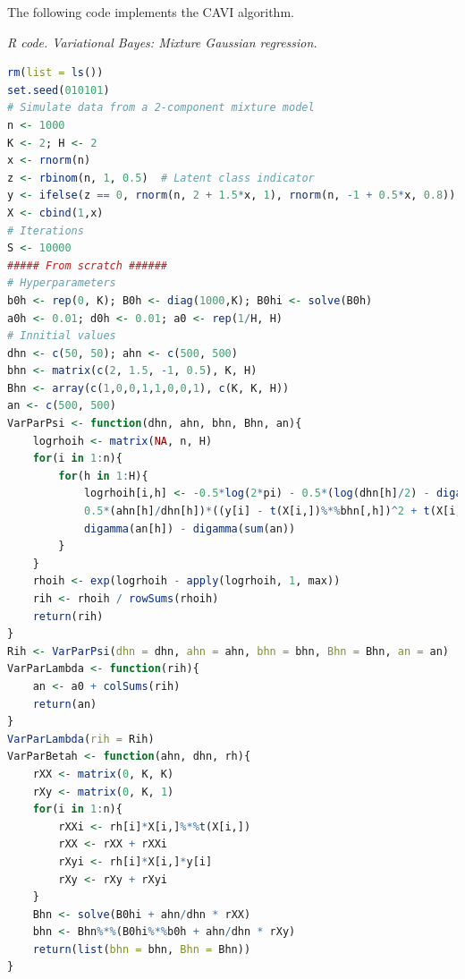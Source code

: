 \begin{enumerate}[leftmargin=*]
The following code implements the CAVI algorithm.
\begin{tcolorbox}[enhanced,width=4.67in,center upper,
	fontupper=\large\bfseries,drop shadow southwest,sharp corners]
	\textit{R code. Variational Bayes: Mixture Gaussian regression.}
	\begin{VF}
		\begin{lstlisting}[language=R]
rm(list = ls())
set.seed(010101)
# Simulate data from a 2-component mixture model
n <- 1000
K <- 2; H <- 2
x <- rnorm(n)
z <- rbinom(n, 1, 0.5)  # Latent class indicator
y <- ifelse(z == 0, rnorm(n, 2 + 1.5*x, 1), rnorm(n, -1 + 0.5*x, 0.8))
X <- cbind(1,x)
# Iterations
S <- 10000
##### From scratch ######
# Hyperparameters
b0h <- rep(0, K); B0h <- diag(1000,K); B0hi <- solve(B0h) 
a0h <- 0.01; d0h <- 0.01; a0 <- rep(1/H, H)
# Innitial values
dhn <- c(50, 50); ahn <- c(500, 500)
bhn <- matrix(c(2, 1.5, -1, 0.5), K, H)
Bhn <- array(c(1,0,0,1,1,0,0,1), c(K, K, H))
an <- c(500, 500)
VarParPsi <- function(dhn, ahn, bhn, Bhn, an){
	logrhoih <- matrix(NA, n, H)
	for(i in 1:n){
		for(h in 1:H){
			logrhoih[i,h] <- -0.5*log(2*pi) - 0.5*(log(dhn[h]/2) - digamma(ahn[h]/2)) -
			0.5*(ahn[h]/dhn[h])*((y[i] - t(X[i,])%*%bhn[,h])^2 + t(X[i,])%*%Bhn[,,h]%*%X[i,]) +
			digamma(an[h]) - digamma(sum(an))
		}
	}
	rhoih <- exp(logrhoih - apply(logrhoih, 1, max)) 
	rih <- rhoih / rowSums(rhoih)
	return(rih)
}
Rih <- VarParPsi(dhn = dhn, ahn = ahn, bhn = bhn, Bhn = Bhn, an = an)
VarParLambda <- function(rih){
	an <- a0 + colSums(rih)
	return(an)
}
VarParLambda(rih = Rih)
VarParBetah <- function(ahn, dhn, rh){
	rXX <- matrix(0, K, K)
	rXy <- matrix(0, K, 1)
	for(i in 1:n){
		rXXi <- rh[i]*X[i,]%*%t(X[i,])
		rXX <- rXX + rXXi
		rXyi <- rh[i]*X[i,]*y[i]
		rXy <- rXy + rXyi
	}
	Bhn <- solve(B0hi + ahn/dhn * rXX)
	bhn <- Bhn%*%(B0hi%*%b0h + ahn/dhn * rXy)
	return(list(bhn = bhn, Bhn = Bhn))
}
\end{lstlisting}
	\end{VF}
\end{tcolorbox}


\end{enumerate}
